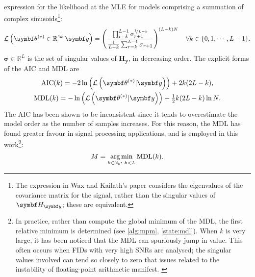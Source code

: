expression for the likelihood at the \ac{MLE} for models comprising a summation
of complex sinusoids\cite{Wax1985}\footnote{
    The expression in Wax and Kailath's paper considers the eigenvalues of the
    covariance matrix for the signal, rather than the singular values of $\Hy$;
    these are equivalent.
}:
\begin{equation}
    \mathcal{L}\left(\bthstar \in \mathbb{R}^{4k} | \by\right) = \left(
        \frac{
            \prod_{r=k}^{L-1} \sigma_{r+1}^{\nicefrac{1}{L-k}}
        }{
            \frac{1}{L-k} \sum_{r=k}^{L-1} \sigma_{r+1}
        }
        \right)^{(L - k) N}
        \quad \forall k \in \lbrace 0, 1, \cdots, L - 1 \rbrace.
        \label{eq:wax-pdf}
\end{equation}
$\symbf{\sigma} \in
\mathbb{R}^L$ is the set of singular values of $\symbf{H}_{\symbf{y}}$,
in decreasing order. The explicit forms of the \ac{AIC} and \ac{MDL} are
\begin{subequations}
    \begin{gather}
        \operatorname{AIC}(k) = -2 \ln\left( \mathcal{L} \left(\bthstar | \by\right) \right) + 2k(2 L - k), \\
        \operatorname{MDL}(k) = -\ln\left( \mathcal{L} \left(\bthstar | \by\right) \right) + \tfrac{1}{2} k(2 L - k) \ln N. \label{eq:mdl}
    \end{gather}
\end{subequations}
The \ac{AIC} has been shown to be inconsistent since it tends to overestimate
the model order as the number of samples increases\cite{Wax1985}. For this
reason, the \ac{MDL} has found greater favour in signal processing
applications, and is employed in this work\footnote{
    In practice, rather than compute the global minimum of the \ac{MDL}, the
    first relative minimum is determined (see \cref{alg:mpm},
    \cref{state:mdl}). When $k$ is very large, it has been noticed that the
    \ac{MDL} can spuriously jump in value. This often occurs when \acp{FID}
    with very high \acp{SNR} are analysed; the singular values involved
    can tend so closely to zero that issues related to the instability of
    floating-point arithmetic manifest.
    \label{fn:argrelmin}
}:
\begin{equation}%
    M = \argmin_{k \in \mathbb{N}_0 :\ k < L} \operatorname{MDL} (k).%
\end{equation}%
